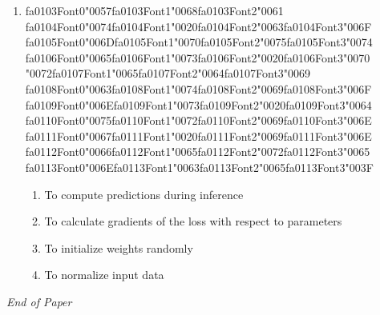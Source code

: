 \documentclass[12pt]{article}
\begin{document}
\begin{enumerate}[label=Q\arabic*.]
\item {\csname fa0103Font0\endcsname\char"0057}{\csname fa0103Font1\endcsname\char"0068}{\csname fa0103Font2\endcsname\char"0061} {\csname fa0104Font0\endcsname\char"0074}{\csname fa0104Font1\endcsname\char"0020}{\csname fa0104Font2\endcsname\char"0063}{\csname fa0104Font3\endcsname\char"006F} {\csname fa0105Font0\endcsname\char"006D}{\csname fa0105Font1\endcsname\char"0070}{\csname fa0105Font2\endcsname\char"0075}{\csname fa0105Font3\endcsname\char"0074} {\csname fa0106Font0\endcsname\char"0065}{\csname fa0106Font1\endcsname\char"0073}{\csname fa0106Font2\endcsname\char"0020}{\csname fa0106Font3\endcsname\char"0070} {\char"0072}{\csname fa0107Font1\endcsname\char"0065}{\csname fa0107Font2\endcsname\char"0064}{\csname fa0107Font3\endcsname\char"0069} {\csname fa0108Font0\endcsname\char"0063}{\csname fa0108Font1\endcsname\char"0074}{\csname fa0108Font2\endcsname\char"0069}{\csname fa0108Font3\endcsname\char"006F} {\csname fa0109Font0\endcsname\char"006E}{\csname fa0109Font1\endcsname\char"0073}{\csname fa0109Font2\endcsname\char"0020}{\csname fa0109Font3\endcsname\char"0064} {\csname fa0110Font0\endcsname\char"0075}{\csname fa0110Font1\endcsname\char"0072}{\csname fa0110Font2\endcsname\char"0069}{\csname fa0110Font3\endcsname\char"006E} {\csname fa0111Font0\endcsname\char"0067}{\csname fa0111Font1\endcsname\char"0020}{\csname fa0111Font2\endcsname\char"0069}{\csname fa0111Font3\endcsname\char"006E} {\csname fa0112Font0\endcsname\char"0066}{\csname fa0112Font1\endcsname\char"0065}{\csname fa0112Font2\endcsname\char"0072}{\csname fa0112Font3\endcsname\char"0065} {\csname fa0113Font0\endcsname\char"006E}{\csname fa0113Font1\endcsname\char"0063}{\csname fa0113Font2\endcsname\char"0065}{\csname fa0113Font3\endcsname\char"003F}
\begin{enumerate}[label=(\Alph*)]
    \item To compute predictions during inference
    \item To calculate gradients of the loss with respect to parameters
    \item To initialize weights randomly
    \item To normalize input data
\end{enumerate}
\end{enumerate}

\vfill
\noindent\textit{End of Paper}
\end{document}
